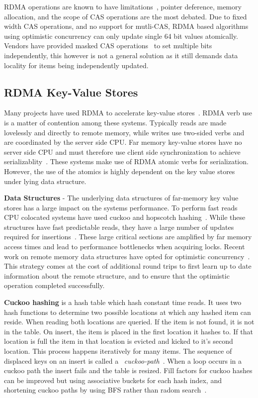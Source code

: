 RDMA operations are known to have limitations~\cite{prism},
pointer deference, memory allocation, and the scope of CAS
operations are the most debated. Due to fixed width CAS
operations, and no support for mutli-CAS, RDMA based
algorithms using optimistic concurrency can only update
single 64 bit values atomically. Vendors have provided
masked CAS operations~\cite{rdma-masked-cas} to set multiple
bits independently, this however is not a general solution
as it still demands data locality for items being
independently updated.


\subsection{RDMA Key-Value Stores}

Many projects have used RDMA to accelerate key-value
stores~\cite{farm,erpc,herd,mica,pilaf,cell,faast,storm,memc3}.
RDMA verb use is a matter of contention among these systems.
Typically reads are made lovelessly and directly to remote
memory, while writes use two-sided verbs and are coordinated
by the server side CPU.
Far memory key-value stores have no server side CPU and must
therefore use client side synchronization to achieve
serializablity~\cite{rolex,fusee,clover,sherman,ford,race}.
These systems make use of RDMA atomic verbs for
serialization. However, the use of the atomics is highly
dependent on the key value stores under lying data
structure.

\textbf{Data Structures} - The underlying data structures of
far-memory key value stores has a large impact on the
systems performance. To perform fast reads CPU colocated
systems have used cuckoo and hopscotch
hashing~\cite{pilaf,herd,cuckoo,hopscotch}. While these
structures have fast predictable reads, they have a large
number of updates required for
insertions~\cite{pilaf,cuckoo-improvements,memc3}. These
large critical sections are amplified by far memory access
times and lead to performance bottlenecks when acquiring
locks. Recent work on remote memory data structures have
opted for optimistic concurrency~\cite{clover,race,ford}.
This strategy comes at the cost of additional round trips to
first learn up to date information about the remote
structure, and to ensure that the optimistic operation
completed successfully.

\textbf{Cuckoo hashing} is a hash table which hash constant
time reads. It uses two hash functions to determine two
possible locations at which any hashed item can reside. When
reading both locations are queried. If the item is not
found, it is not in the table. On insert, the item is placed
in the first location it hashes to. If that location is full
the item in that location is evicted and kicked to it's
second location.  This process happens iteratively for many
items. The sequence of displaced keys on an insert is called
a ~\textit{cuckoo-path}~\cite{cuckoo-improvements}. When a
loop occurs in a cuckoo path the insert fails and the table
is resized. Fill factors for cuckoo hashes can be improved
but using associative buckets for each hash index, and
shortening cuckoo paths by using BFS rather than radom
search~\cite{cuckoo-improvements}.

